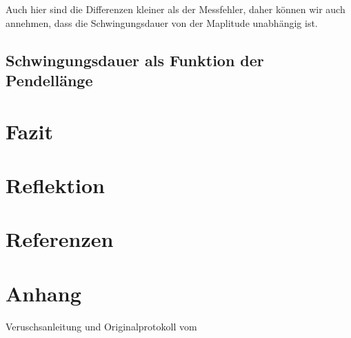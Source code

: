 \documentclass[12pt, a4paper, twoside]{article}
\begin{document}
Auch hier sind die Differenzen kleiner als der Messfehler, daher können wir auch annehmen, dass die Schwingungsdauer von der Maplitude unabhängig ist.

\subsection{Schwingungsdauer als Funktion der Pendellänge}

\section{Fazit}
\section{Reflektion}
\section{Referenzen}
\printbibliography[heading=none]
\section{Anhang}
Veruschsanleitung und Originalprotokoll vom \labdate
\end{document}
